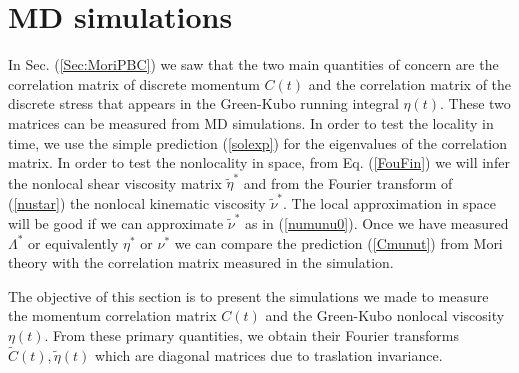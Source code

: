 \documentclass[b5paper,openright,11pt]{book}
\begin{document}


\section{MD simulations}
\label{Sec:SimPBC}
In Sec. (\ref{Sec:MoriPBC}) we saw that the  two main  quantities of  concern  are the  correlation matrix  of
discrete momentum  $C(t)$ and the  correlation matrix of  the discrete
stress  that appears  in  the Green-Kubo  running integral  $\eta(t)$.
These two  matrices can be measured  from MD simulations. In  order to
test the locality in time, we use the simple prediction (\ref{solexp})
for the  eigenvalues of the correlation  matrix. In order to  test the
nonlocality  in space,  from Eq.   (\ref{FouFin}) we  will infer  the
nonlocal shear viscosity matrix  $\tilde{\eta}^*$ and from the Fourier
transform   of  (\ref{nustar})   the  nonlocal   kinematic  viscosity
$\tilde{\nu}^*$. The local  approximation in space will be  good if we
can approximate  $\tilde{\nu}^*$ as in (\ref{numunu0}).   Once we have
measured  $\Lambda^*$  or  equivalently  $\eta^*$ or  $\nu^*$  we  can
compare  the  prediction  (\ref{Cmunut})  from Mori  theory  with  the
correlation matrix measured in the simulation.

The objective of this section is to present the simulations we made to measure the
momentum  correlation  matrix  $C(t)$  and  the  Green-Kubo  nonlocal
viscosity $\eta(t)$.   From these primary quantities,  we obtain their
Fourier transforms  $\tilde{C}(t),\tilde{\eta}(t)$ which  are diagonal
matrices  due to  traslation invariance.  
\end{document}
